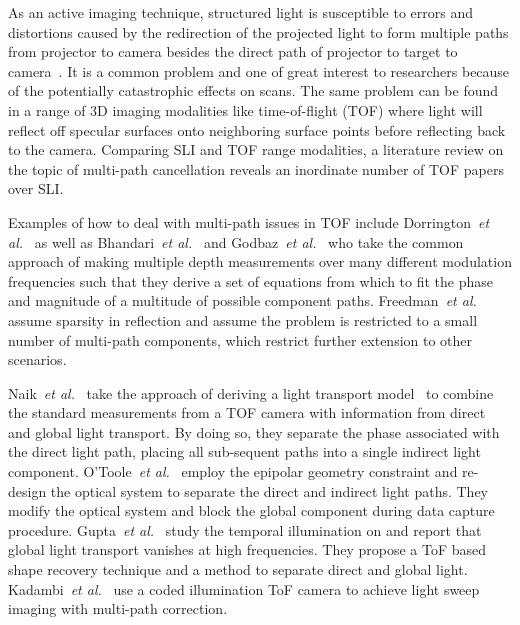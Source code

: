 \documentclass[10pt]{article}
\begin{document}
As an active imaging technique, structured light is susceptible to errors and distortions caused by the redirection of the projected light to form multiple paths from projector to camera besides the direct path of projector to target to camera~\cite{6136522}.  It is a common problem and one of great interest to researchers because of the potentially catastrophic effects on scans. The same problem can be found in a range of 3D imaging modalities like time-of-flight (TOF) where light will reflect off specular surfaces onto neighboring surface points before reflecting back to the camera. Comparing SLI and TOF range modalities, a literature review on the topic of multi-path cancellation reveals an inordinate number of TOF papers over SLI.

Examples of how to deal with multi-path issues in TOF include Dorrington~{\it et al.}~\cite{dorrington2011separating} as well as Bhandari~{\it et al.}~\cite{bhandari2013multifrequency} and Godbaz~{\it et al.}~\cite{godbaz2012closed} who take the common approach of making multiple depth measurements over many different modulation frequencies such that they derive a set of equations from which to fit the phase and magnitude of a multitude of possible component paths. Freedman~{\it et al.}~\cite{freedman2014sra} assume sparsity in reflection and assume the problem is restricted to a small number of multi-path components, which restrict further extension to other scenarios. 

Naik~{\it et al.}~\cite{naik2015light} take the approach of deriving a light transport model~\cite{Nayar:2006:FSD:1141911.1141977} to combine the standard measurements from a TOF camera with information from direct and global light transport.  By doing so, they separate the phase associated with the direct light path, placing all sub-sequent paths into a single indirect light component.  O'Toole~{\it et al.}~\cite{o20143d,o2014temporal} employ the epipolar geometry constraint and re-design the optical system to separate the direct and indirect light paths. They modify the optical system and block the global component during data capture procedure.  Gupta~{\it et al.}~\cite{gupta2015phasor} study the temporal illumination on and report that global light transport vanishes at high frequencies. They propose a ToF based shape recovery technique and a method to separate direct and global light. Kadambi~{\it et al.}~\cite{kadambi2013coded} use a coded illumination ToF camera to achieve light sweep imaging with multi-path correction. 
\end{document}
